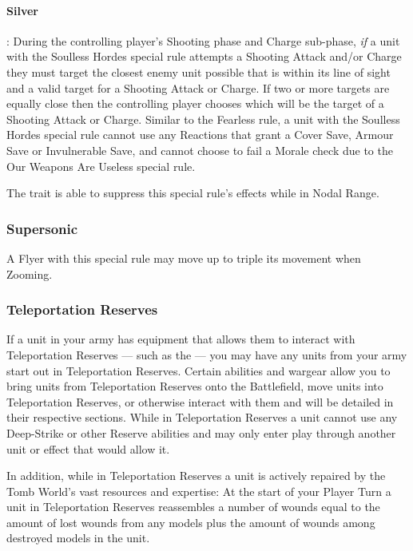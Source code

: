 \begin{multicols}{2}
\paragraph{Silver}: During the controlling player's Shooting phase and Charge sub-phase, \textit{if} a unit with the Soulless Hordes special rule attempts a Shooting Attack and/or Charge they must target the closest enemy unit possible that is within its line of sight and a valid target for a Shooting Attack or Charge. If two or more targets are equally close then the controlling player chooses which will be the target of a Shooting Attack or Charge. Similar to the Fearless rule, a unit with the Soulless Hordes special rule cannot use any Reactions that grant a Cover Save, Armour Save or Invulnerable Save, and cannot choose to fail a Morale check due to the Our Weapons Are Useless special rule.

The  trait is able to suppress this special rule's effects while in Nodal Range.

\subsubsection{Supersonic} \label{Supersonic}

A Flyer with this special rule may move up to triple its movement when Zooming.

\subsubsection{Teleportation Reserves} \label{Teleportation Reserves}

If a unit in your army has equipment that allows them to interact with Teleportation Reserves — such as the  — you may have any units from your army start out in Teleportation Reserves. Certain abilities and wargear allow you to bring units from Teleportation Reserves onto the Battlefield, move units into Teleportation Reserves, or otherwise interact with them and will be detailed in their respective sections. While in Teleportation Reserves a unit cannot use any Deep-Strike or other Reserve abilities and may only enter play through another unit or effect that would allow it.

In addition, while in Teleportation Reserves a unit is actively repaired by the Tomb World's vast resources and expertise: At the start of your Player Turn a unit in Teleportation Reserves reassembles a number of wounds equal to the amount of lost wounds from any models plus the amount of wounds among destroyed models in the unit.


\end{multicols}
